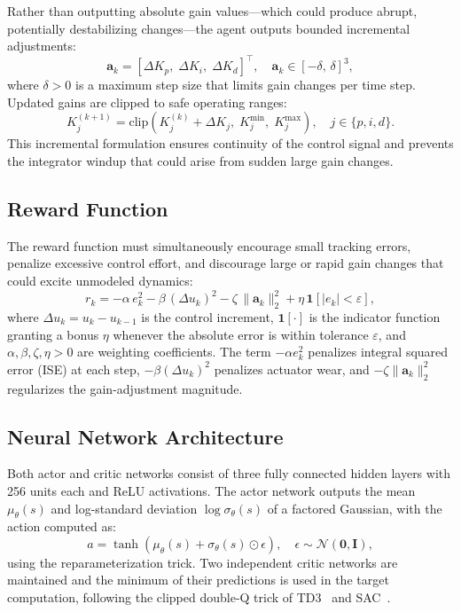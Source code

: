 \documentclass[conference,a4paper]{IEEEtran}[2015/08/26]
\newcommand{\vek}[1]{\bm{#1}}
\begin{document}
Rather than outputting absolute gain values---which could produce
abrupt, potentially destabilizing changes---the agent outputs bounded
incremental adjustments:
\begin{equation}
  \vek{a}_k = [\Delta K_p,\; \Delta K_i,\; \Delta K_d]^\top,
  \quad \vek{a}_k \in [-\delta,\, \delta]^3,
  \label{eq:action}
\end{equation}
where $\delta > 0$ is a maximum step size that limits gain changes per
time step. Updated gains are clipped to safe operating ranges:
\begin{equation}
  K_j^{(k+1)} = \mathrm{clip}\!\left(K_j^{(k)} + \Delta K_j,\;
                 K_j^{\min},\; K_j^{\max}\right),
  \quad j \in \{p, i, d\}.
  \label{eq:clip}
\end{equation}
This incremental formulation ensures continuity of the control signal
and prevents the integrator windup that could arise from sudden large
gain changes.

\subsection{Reward Function}

The reward function must simultaneously encourage small tracking errors,
penalize excessive control effort, and discourage large or rapid gain
changes that could excite unmodeled dynamics:
\begin{equation}
  r_k = -\alpha\, e_k^2
         - \beta\, (\Delta u_k)^2
         - \zeta\, \|\vek{a}_k\|_2^2
         + \eta\, \mathbf{1}\!\left[|e_k| < \varepsilon\right],
  \label{eq:reward}
\end{equation}
where $\Delta u_k = u_k - u_{k-1}$ is the control increment,
$\mathbf{1}[\cdot]$ is the indicator function granting a bonus $\eta$
whenever the absolute error is within tolerance $\varepsilon$, and
$\alpha, \beta, \zeta, \eta > 0$ are weighting coefficients. The
term $-\alpha e_k^2$ penalizes integral squared error (ISE) at each
step, $-\beta(\Delta u_k)^2$ penalizes actuator wear, and $-\zeta
\|\vek{a}_k\|_2^2$ regularizes the gain-adjustment magnitude.

\subsection{Neural Network Architecture}

Both actor and critic networks consist of three fully connected hidden
layers with 256 units each and ReLU activations. The actor network
outputs the mean $\mu_\theta(s)$ and log-standard deviation
$\log\sigma_\theta(s)$ of a factored Gaussian, with the action computed
as:
\begin{equation}
  a = \tanh\!\left(\mu_\theta(s) + \sigma_\theta(s) \odot \epsilon\right),
  \quad \epsilon \sim \mathcal{N}(\mathbf{0}, \mathbf{I}),
  \label{eq:reparam}
\end{equation}
using the reparameterization trick. Two independent critic networks are
maintained and the minimum of their predictions is used in the target
computation, following the clipped double-Q trick of TD3~\cite{Fujimoto2018}
and SAC~\cite{Haarnoja2018}.
\end{document}
